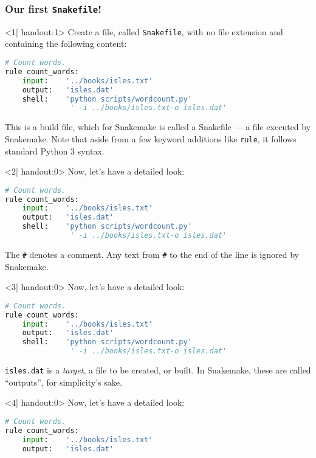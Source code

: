 \begin{frame}[fragile]
  \frametitle{Our first \texttt{Snakefile}!}
  \begin{onlyenv}<1| handout:1>
    Create a file, called \texttt{Snakefile}, with no file extension and containing the following content:
    \begin{lstlisting}[language=Python,style=Python]
# Count words.
rule count_words:
    input:    '../books/isles.txt'
    output:   'isles.dat'
    shell:    'python scripts/wordcount.py' 
               ' -i ../books/isles.txt-o isles.dat'
    \end{lstlisting}

  This is a build file, which for Snakemake is called a Snakefile — a file executed by Snakemake. Note that aside from a few keyword additions like \texttt{rule}, it follows standard Python 3 syntax.
    \end{onlyenv}
  \begin{onlyenv}<2| handout:0>
   Now, let's have a detailed look:
   \begin{lstlisting}[language=Python,style=Python]
# Count words.
rule count_words:
    input:    '../books/isles.txt'
    output:   'isles.dat'
    shell:    'python scripts/wordcount.py' 
               ' -i ../books/isles.txt-o isles.dat'
    \end{lstlisting}
    The \texttt{\#} denotes a comment. Any text from \texttt{\#} to the end of the line is ignored by Snakemake.
  \end{onlyenv}
  \begin{onlyenv}<3| handout:0>
   Now, let's have a detailed look:
   \begin{lstlisting}[language=Python,style=Python]
# Count words.
rule count_words:
    input:    '../books/isles.txt'
    output:   'isles.dat'
    shell:    'python scripts/wordcount.py' 
               ' -i ../books/isles.txt-o isles.dat'
    \end{lstlisting}
    \texttt{isles.dat} is a \emph{target}, a file to be created, or built. In Snakemake, these are called “outputs”, for simplicity’s sake.
  \end{onlyenv}
  \begin{onlyenv}<4| handout:0>
   Now, let's have a detailed look:
   \begin{lstlisting}[language=Python,style=Python]
# Count words.
rule count_words:
    input:    '../books/isles.txt'
    output:   'isles.dat'

\end{lstlisting}
\end{onlyenv}
\end{frame}
